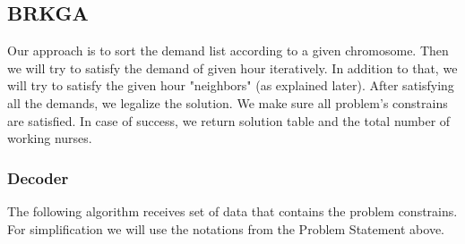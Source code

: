 \documentclass{article}
\newcommand\tab[1][1cm]{\hspace*{#1}}
\begin{document}
	\subsection{BRKGA}
	\tab Our approach is to sort the demand list according to a given chromosome. Then we will try to satisfy the demand of given hour iteratively. In addition to that, we will try to satisfy the given hour "neighbors" (as explained later). After satisfying all the demands, we legalize the solution. We make sure all problem's constrains are satisfied. In case of success, we return solution table and the total number of working nurses.
		\subsubsection{Decoder}
			\tab The following algorithm receives set of data that contains the problem constrains. For simplification we will use the notations from the Problem Statement above.
\end{document}
